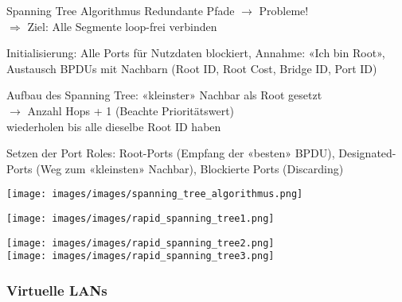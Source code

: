 \begin{KR}{Spanning Tree Algorithmus}
    Redundante Pfade $\rightarrow$ Probleme! \\$\Rightarrow$ Ziel: Alle Segmente loop-frei verbinden

    \vspace{1mm}
    
        Initialisierung: Alle Ports für Nutzdaten blockiert, Annahme: «Ich bin Root», Austausch BPDUs mit Nachbarn (Root ID, Root Cost, Bridge ID, Port ID)
    
    \vspace{1mm}

    Aufbau des Spanning Tree: «kleinster» Nachbar als Root gesetzt \\ $\rightarrow$ Anzahl Hops + 1 (Beachte Prioritätswert)\\
    wiederholen bis alle dieselbe Root ID haben
    
    \vspace{1mm}

    \begin{minipage}{0.6\linewidth}
    Setzen der Port Roles: Root-Ports (Empfang der «besten» BPDU), Designated-Ports (Weg zum «kleinsten» Nachbar), Blockierte Ports (Discarding)
\end{minipage}
\hspace{1mm}
    \begin{minipage}{0.37\linewidth}
        \texttt{[image: images/images/spanning\_tree\_algorithmus.png]}
    \end{minipage}
\end{KR}

\begin{example}
    \begin{minipage}{0.48\linewidth}
        \texttt{[image: images/images/rapid\_spanning\_tree1.png]}
    \end{minipage}
    \begin{minipage}{0.48\linewidth}
        \texttt{[image: images/images/rapid\_spanning\_tree2.png]}\\
        \texttt{[image: images/images/rapid\_spanning\_tree3.png]}
    \end{minipage}
\end{example}

\subsubsection{Virtuelle LANs}

